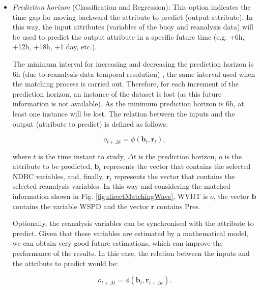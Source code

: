 \documentclass[energies,article,submit,moreauthors,pdftex]{Definitions/mdpi}
\begin{document}
					\begin{itemize}

						\item \textit{Prediction horizon} (Classification and Regression): This option indicates the time gap for moving backward the attribute to predict (output attribute). In this way, the input attributes (variables of the buoy and reanalysis data) will be used to predict the output attribute in a specific future time (e.g. +6h, +12h, +18h, +1 day, etc.).
						
						The minimum interval for increasing and decreasing the prediction horizon is $6$h (due to reanalysis data temporal resolution) \cite{DORADOMORENO2017428}, the same interval used when the matching process is carried out. Therefore, for each increment of the prediction horizon, an instance of the dataset is lost (as this future information is not available). As the minimum prediction horizon is $6$h, at least one instance will be lost. The relation between the inputs and the output (attribute to predict) is defined as follows:
						\begin{linenomath*}
							\begin{equation}
								o_{t+\Delta t}=\phi(\mathbf{b}_t,\mathbf{r}_{t}),
								\label{eq:noSynchronisingRD}
							\end{equation}
						\end{linenomath*}
						where $t$ is the time instant to study, $\Delta t$ is the prediction horizon, $o$ is the attribute to be predicted, $\mathbf{b}_t$ represents the vector that contains the selected NDBC variables, and, finally, $\mathbf{r}_t$ represents the vector that contains the selected reanalysis variables. In this way and considering the matched information shown in Fig. \ref{fig:directMatchingWave}, WVHT is $o$, the vector $\mathbf{b}$ contains the variable WSPD and the vector $\mathbf{r}$ contains Pres.
						
						Optionally, the reanalysis variables can be synchronised with the attribute to predict. Given that these variables are estimated by a mathematical model, we can obtain very good future estimations, which can improve the performance of the results. In this case, the relation between the inputs and the attribute to predict would be:
						\begin{linenomath*}
							\begin{equation}
								o_{t+\Delta t}=\phi(\mathbf{b}_t,\mathbf{r}_{t+\Delta t}).
								\label{eq:synchronisingRD}
							\end{equation}
						\end{linenomath*}
						

\end{itemize}
\end{document}
